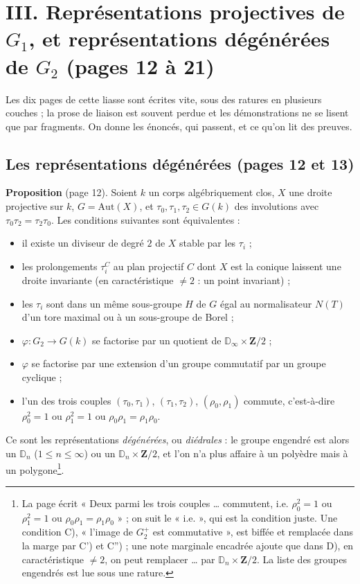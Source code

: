 \documentclass[11pt,a4paper]{article}
\begin{document}
\section*{III. Représentations projectives de $G_1$, et représentations dégénérées de $G_2$ (pages 12 à 21)}

Les dix pages de cette liasse sont écrites vite, sous des ratures en
plusieurs couches ; la prose de liaison est souvent perdue et les
démonstrations ne se lisent que par fragments. On donne les énoncés, qui
passent, et ce qu'on lit des preuves.

\subsection*{Les représentations dégénérées (pages 12 et 13)}

\textbf{Proposition} (page 12). Soient $k$ un corps algébriquement clos,
$X$ une droite projective sur $k$, $G = \mathrm{Aut}(X)$, et $\tau_0, \tau_1,
\tau_2 \in G(k)$ des involutions avec $\tau_0\tau_2 = \tau_2\tau_0$. Les
conditions suivantes sont équivalentes :
\begin{itemize}
  \item[A)] il existe un diviseur de degré $2$ de $X$ stable par les $\tau_i$ ;
  \item[A')] les prolongements $\tau_i^C$ au plan projectif $C$ dont $X$ est la
    conique laissent une droite invariante (en caractéristique $\neq 2$ : un
    point invariant) ;
  \item[B)] les $\tau_i$ sont dans un même sous-groupe $H$ de $G$ égal au
    normalisateur $N(T)$ d'un tore maximal ou à un sous-groupe de Borel ;
  \item[C')] $\varphi : G_2 \to G(k)$ se factorise par un quotient de
    $\mathbb{D}_\infty \times \mathbf{Z}/2$ ;
  \item[C'')] $\varphi$ se factorise par une extension d'un groupe commutatif
    par un groupe cyclique ;
  \item[D)] l'un des trois couples $(\tau_0, \tau_1)$, $(\tau_1, \tau_2)$,
    $(\rho_0, \rho_1)$ commute, c'est-à-dire $\rho_0^2 = 1$ ou $\rho_1^2 = 1$
    ou $\rho_0\rho_1 = \rho_1\rho_0$.
\end{itemize}
Ce sont les représentations \emph{dégénérées}, ou \emph{diédrales} : le
groupe engendré est alors un $\mathbb{D}_n$ ($1 \leq n \leq \infty$) ou un
$\mathbb{D}_n \times \mathbf{Z}/2$, et l'on n'a plus affaire à un polyèdre
mais à un polygone\footnote{La page écrit « Deux parmi les trois couples
\ldots{} commutent, i.e. $\rho_0^2 = 1$ ou $\rho_1^2 = 1$ ou $\rho_0\rho_1 =
\rho_1\rho_0$ » ; on suit le « i.e. », qui est la condition juste. Une
condition C), « l'image de $G_2^+$ est commutative », est biffée et remplacée
dans la marge par C') et C'') ; une note marginale encadrée ajoute que dans D),
en caractéristique $\neq 2$, on peut remplacer \ldots{} par $\mathbb{D}_n
\times \mathbf{Z}/2$. La liste des groupes engendrés est lue sous une
rature.}.
\end{document}
